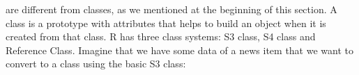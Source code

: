 




are different from classes, as we mentioned at the beginning of this section. A class is a prototype with 
attributes that helps to build an object when it is created from that class. R has three class systems: S3 class, 
S4 class and Reference Class.  Imagine that we have some data of a news item that we want to convert to a class using the basic S3 class:









